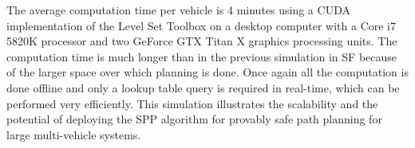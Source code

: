The average computation time per vehicle is 4 minutes using a CUDA implementation of the Level Set Toolbox on a desktop computer with a Core i7 5820K processor and two GeForce GTX Titan X graphics processing units. The computation time is much longer than in the previous simulation in SF because of the larger space over which planning is done. Once again all the computation is done offline and only a lookup table query is required in real-time, which can be performed very efficiently. This simulation illustrates the scalability and the potential of deploying the SPP algorithm for provably safe path planning for large multi-vehicle systems.